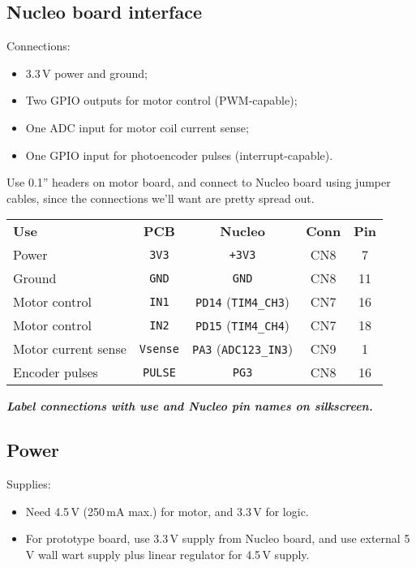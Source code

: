 \documentclass[a4paper,11pt,article]{memoir}
\newcommand{\todo}[1]{{\color{red}\textit{\textbf{#1}}}}
\begin{document}
\subsection{Nucleo board interface}

Connections:
\begin{itemize}
  \item{3.3\,V power and ground;}
  \item{Two GPIO outputs for motor control (PWM-capable);}
  \item{One ADC input for motor coil current sense;}
  \item{One GPIO input for photoencoder pulses (interrupt-capable).}
\end{itemize}

Use 0.1'' headers on motor board, and connect to Nucleo board using
jumper cables, since the connections we'll want are pretty spread out.

\begin{center}
  \begin{tabular}{lcccc}
    \textbf{Use} & \textbf{PCB} & \textbf{Nucleo} & \textbf{Conn} & \textbf{Pin} \\
    Power  & \texttt{3V3} & \texttt{+3V3} & CN8 & 7\\
    Ground & \texttt{GND} & \texttt{GND} & CN8 & 11 \\
    Motor control & \texttt{IN1} & \texttt{PD14} (\texttt{TIM4\_CH3}) & CN7 & 16 \\
    Motor control & \texttt{IN2} & \texttt{PD15} (\texttt{TIM4\_CH4}) & CN7 & 18 \\
    Motor current sense & \texttt{Vsense} & \texttt{PA3} (\texttt{ADC123\_IN3}) & CN9 & 1 \\
    Encoder pulses & \texttt{PULSE} & \texttt{PG3} & CN8 & 16 \\
  \end{tabular}
\end{center}

\todo{Label connections with use and Nucleo pin names on silkscreen.}

\subsection{Power}

Supplies:
\begin{itemize}
  \item{Need 4.5\,V (250\,mA max.) for motor, and 3.3\,V for logic.}
  \item{For prototype board, use 3.3\,V supply from Nucleo board, and
    use external 5\,V wall wart supply plus linear regulator for
    4.5\,V supply.}
\end{itemize}
\end{document}
